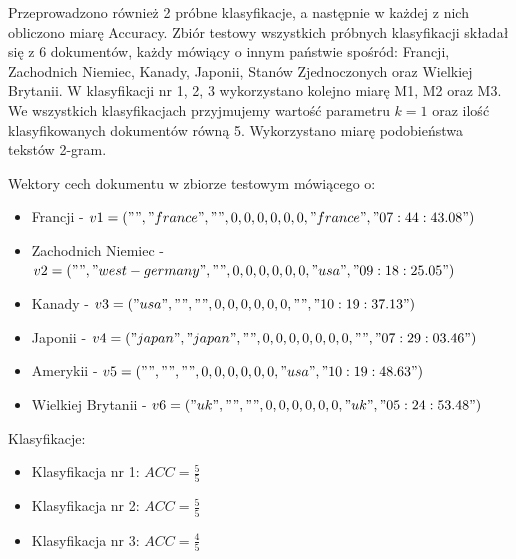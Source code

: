 \documentclass{classrep}
\begin{document}
\begin{enumerate}
\end{enumerate} 

Przeprowadzono również 2 próbne klasyfikacje, a następnie w każdej z nich obliczono miarę Accuracy. 
Zbiór testowy wszystkich próbnych klasyfikacji składał się z 6 dokumentów, każdy mówiący o innym państwie spośród: Francji, Zachodnich Niemiec, Kanady, Japonii, Stanów Zjednoczonych oraz Wielkiej Brytanii.
W klasyfikacji nr 1, 2, 3 wykorzystano kolejno miarę M1, M2 oraz M3. We wszystkich klasyfikacjach przyjmujemy wartość parametru $k = 1$ oraz ilość klasyfikowanych dokumentów równą 5. Wykorzystano miarę podobieństwa tekstów 2-gram.

Wektory cech dokumentu w zbiorze testowym mówiącego o:
\begin{itemize}
\item Francji - $v1 = ("", "france", "", 0, 0, 0, 0, 0, 0, "france", "07:44:43.08")$
\item Zachodnich Niemiec - $v2 = ("", "west-germany", "", 0, 0, 0, 0, 0, 0, "usa", "09:18:25.05")$
\item Kanady - $v3 = ("usa", "", "", 0, 0, 0, 0, 0, 0, "", "10:19:37.13")$
\item Japonii - $v4 = ("japan", "japan", "", 0, 0, 0, 0, 0, 0, 0, "", "07:29:03.46")$
\item Amerykii - $v5 = ("", "", "", 0, 0, 0, 0, 0, 0, "usa", "10:19:48.63")$
\item Wielkiej Brytanii - $v6 = ("uk", "", "", 0, 0, 0, 0, 0, 0, "uk", "05:24:53.48")$ \\
\end{itemize} 

Klasyfikacje:
\begin{itemize}
\item Klasyfikacja nr 1:
$ACC = \frac{5}{5}$ \\
\item Klasyfikacja nr 2:
$ACC = \frac{5}{5}$\\
\item Klasyfikacja nr 3:
$ACC = \frac{4}{5}$
\end{itemize}

\end{document}
